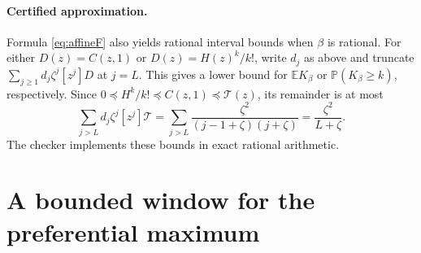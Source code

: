 \documentclass[runningheads,envcountsame,orivec]{llncs}
\newcommand{\E}{\mathbb E}
\newcommand{\PP}{\mathbb P}
\begin{document}
\paragraph{Certified approximation.}
Formula \eqref{eq:affineF} also yields rational interval bounds when
$\beta$ is rational. For either $D(z)=C(z,1)$ or
$D(z)=H(z)^k/k!$, write $d_j$ as above and truncate
$\sum_{j\ge1}d_j\zeta^j[z^j]D$ at $j=L$. This gives a lower bound
for $\E K_\beta$ or $\PP(K_\beta\ge k)$, respectively. Since
$0\preceq H^k/k!\preceq C(z,1)\preceq\mathcal T(z)$,
its remainder is at most
\begin{equation}\label{eq:affinecertified}
 \sum_{j>L}d_j\zeta^j[z^j]\mathcal T
 =\sum_{j>L}\frac{\zeta^2}{(j-1+\zeta)(j+\zeta)}
 =\frac{\zeta^2}{L+\zeta}.
\end{equation}
The checker implements these bounds in exact rational arithmetic.


\section{A bounded window for the preferential maximum}\label{app:refinedmaximum}
\end{document}
